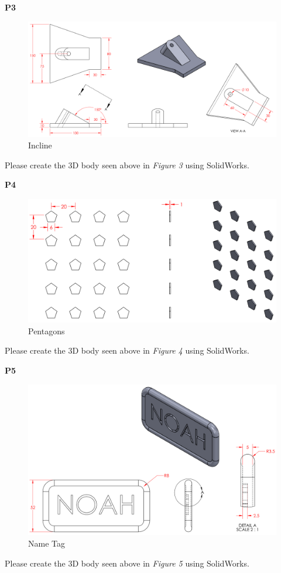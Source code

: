 \documentclass{article}
\begin{document}
{%
\textbf{P3}
\begin{figure}[H]
  \centering
  \includegraphics[width=1.075\linewidth]{images/3.png}  
  \caption{Incline}
  \label{fig:3}
\end{figure}
\noindent Please create the 3D body seen above in \textit{Figure 3} using SolidWorks.

\textbf{P4}
\begin{figure}[H]
  \centering
  \includegraphics[width=\linewidth]{images/4.png}  
  \caption{Pentagons}
  \label{fig:4}
\end{figure}
\noindent Please create the 3D body seen above in \textit{Figure 4} using SolidWorks.

\textbf{P5}
\begin{figure}[H]
  \centering
  \includegraphics[width=.825\linewidth]{images/5.png}  
  \caption{Name Tag}
  \label{fig:5}
\end{figure}
\noindent Please create the 3D body seen above in \textit{Figure 5} using SolidWorks.

}
\end{document}

